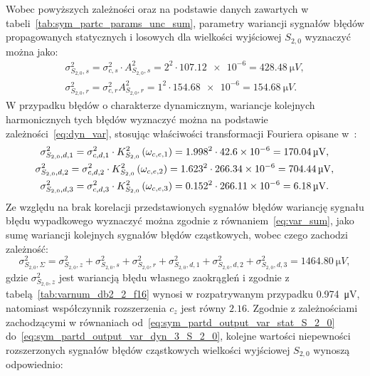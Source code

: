 Wobec powyższych zależności oraz na podstawie danych zawartych w tabeli~\ref{tab:sym_partc_params_unc_sum}, parametry wariancji sygnałów błędów propagowanych statycznych i losowych dla wielkości wyjściowej $S_{2,0}$ wyznaczyć można jako:
\begin{gather}
\sigma_{S_{2,0},s}^{2} = \sigma_{c,s}^{2} \cdot A_{S_{2,0},s}^{2} = 2^{2} \cdot \num{107.12e-6} = \qty{428.48}{\micro V} \label{eq:sym_partd_output_var_stat_S_2_0}, \\
\sigma_{S_{2,0},r}^{2} = \sigma_{c,r}^{2} A_{S_{2,0},r}^{2} = 1^{2} \cdot \num{154.68e-6} = \qty{154.68}{\micro V} \label{eq:sym_partd_output_var_rand_S_2_0}.
\end{gather}
W przypadku błędów o charakterze dynamicznym, wariancje kolejnych harmonicznych tych błędów wyznaczyć można na podstawie zależności~\eqref{eq:dyn_var}, stosując właściwości transformacji Fouriera opisane w~\cite{oppenheim_sns}:
\begin{gather}
\sigma_{S_{2,0},d,1}^{2} = \sigma_{c,d,1}^{2} \cdot K_{S_{2,0}}^{2} \left(\omega_{c,e,1}\right) = {1.998}^{2} \cdot \num{42.6e-6} = \qty{170.04}{\micro V} \label{eq:sym_partd_output_var_dyn_1_S_2_0}, \\
\sigma_{S_{2,0},d,2}^{2} = \sigma_{c,d,2}^{2} \cdot K_{S_{2,0}}^{2} \left(\omega_{c,e,2}\right) = {1.623}^{2} \cdot \num{266.34e-6} = \qty{704.44}{\micro V} \label{eq:sym_partd_output_var_dyn_2_S_2_0}, \\
\sigma_{S_{2,0},d,3}^{2} = \sigma_{c,d,3}^{2} \cdot K_{S_{2,0}}^{2} \left(\omega_{c,e,3}\right) = {0.152}^{2} \cdot \num{266.11e-6} = \qty{6.18}{\micro V} \label{eq:sym_partd_output_var_dyn_3_S_2_0}.
\end{gather}
Ze względu na brak korelacji przedstawionych sygnałów błędów wariancję sygnału błędu wypadkowego wyznaczyć można zgodnie z równaniem~\eqref{eq:var_sum}, jako sumę wariancji kolejnych sygnałów błędów cząstkowych, wobec czego zachodzi zależność:
\begin{equation}
\sigma_{S_{2,0},\Sigma}^{2} = \sigma_{S_{2,0},z}^{2} + \sigma_{S_{2,0},s}^{2} + \sigma_{S_{2,0},r}^{2} + \sigma_{S_{2,0},d,1}^{2} + \sigma_{S_{2,0},d,2}^{2} + \sigma_{S_{2,0},d,3}^{2} = \qty{1464.80}{\micro V} \label{eq:sym_partd_output_var_sum_S_2_0},
\end{equation}
gdzie $\sigma_{S_{2,0},z}^{2}$ jest wariancją błędu własnego zaokrągleń i zgodnie z tabelą~\ref{tab:varnum_db2_2_f16} wynosi w rozpatrywanym przypadku \qty{0.974}{\micro V}, natomiast współczynnik rozszerzenia $c_{z}$ jest równy $2.16$.
Zgodnie z zależnościami zachodzącymi w równaniach od~\eqref{eq:sym_partd_output_var_stat_S_2_0} do~\eqref{eq:sym_partd_output_var_dyn_3_S_2_0}, kolejne wartości niepewności rozszerzonych sygnałów błędów cząstkowych wielkości wyjściowej $S_{2,0}$ wynoszą odpowiednio:
